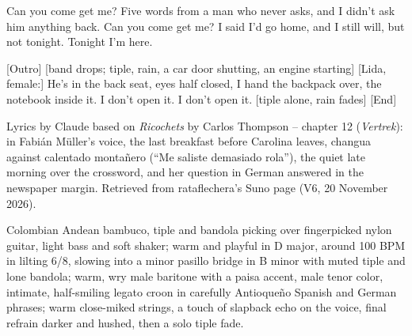 \begin{lyrics}
Can you come get me?
Five words from a man who never asks,
and I didn't ask him anything back.
Can you come get me?
I said I'd go home, and I still will,
but not tonight. Tonight I'm here.

[Outro]
[band drops; tiple, rain, a car door shutting, an engine starting]
[Lida, female:]
He's in the back seat, eyes half closed,
I hand the backpack over,
the notebook inside it.
I don't open it.
I don't open it.
[tiple alone, rain fades]
[End]
\end{lyrics}

\begin{notes}
Lyrics by Claude based on \emph{Ricochets} by Carlos Thompson -- chapter 12 (\emph{Vertrek}): in Fabián Müller's voice, the last breakfast before Carolina leaves, changua against calentado montañero (``Me saliste demasiado rola''), the quiet late morning over the crossword, and her question in German answered in the newspaper margin. Retrieved from rataflechera's Suno page (V6, 20 November 2026).
\end{notes}
\begin{style}
Colombian Andean bambuco, tiple and bandola picking over fingerpicked nylon guitar, light bass and soft shaker; warm and playful in D major, around 100 BPM in lilting 6/8, slowing into a minor pasillo bridge in B minor with muted tiple and lone bandola; warm, wry male baritone with a paisa accent, male tenor color, intimate, half-smiling legato croon in carefully Antioqueño Spanish and German phrases; warm close-miked strings, a touch of slapback echo on the voice, final refrain darker and hushed, then a solo tiple fade.
\end{style}
